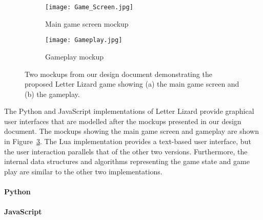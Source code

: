 \begin{figure}
    \centering
    \begin{subfigure}{0.49\textwidth}
        \texttt{[image: Game\_Screen.jpg]}
        \caption{Main game screen mockup}
        \label{mainscreenmockup}
    \end{subfigure}
    \begin{subfigure}{0.49\textwidth}
        \texttt{[image: Gameplay.jpg]}
        \caption{Gameplay mockup}
        \label{gameplaymockup}
    \end{subfigure}
    \caption{Two mockups from our design document demonstrating the proposed Letter Lizard game
    showing (a) the main game screen and (b) the gameplay.}
    \label{mockups}
\end{figure}

The Python and JavaScript implementations of Letter Lizard provide graphical user interfaces
that are modelled after the mockups presented in our design document. The mockups showing the
main game screen and gameplay are shown in Figure~\ref{mockups}. The Lua implementation provides
a text-based user interface\footnotemark,
but the user interaction parallels that of the other two versions.
Furthermore, the internal data structures and algorithms representing the game state and game play
are similar to the other two implementations.


\paragraph{Python}


\paragraph{JavaScript}


